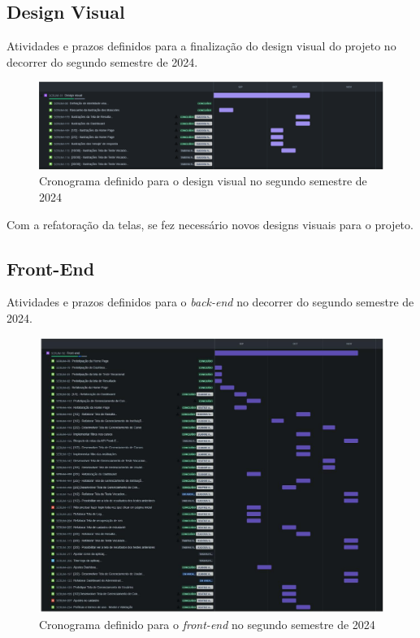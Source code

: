 \begin{apendicesenv}
\subsection*{Design Visual}
Atividades e prazos definidos para a finalização do design visual do projeto no decorrer do segundo semestre de 2024. 

\begin{figure}[ht]
        \centering
\includegraphics[width=1.0\textwidth]{images/design-visual-cronograma.png}
        \caption{Cronograma definido para o design visual no segundo semestre de 2024}
        \label{fig:designvisualcronograma}
    \end{figure}
\newpage

Com a refatoração da telas, se fez necessário novos designs visuais para o projeto.

\subsection*{Front-End}
Atividades e prazos definidos para o \textit{back-end} no decorrer do segundo semestre de 2024.

\begin{figure}[ht]
        \centering
\includegraphics[width=1.0\textwidth]{images/front-end-cronograma.png}
        \caption{Cronograma definido para o \textit{front-end} no segundo semestre de 2024}
        \label{fig:frontendcronograma}
    \end{figure}
\newpage


\end{apendicesenv}
